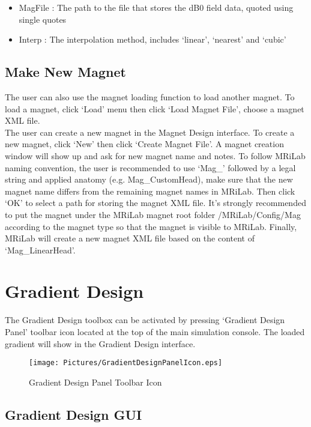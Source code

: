 \documentclass{book}%
\begin{document}
\begin{itemize}
	\item MagFile : The path to the file that stores the dB0 field data, quoted using single quotes
	\item Interp : The interpolation method, includes `linear', `nearest' and `cubic'
\end{itemize}

\subsection{Make New Magnet}

The user can also use the magnet loading function to load another magnet. To load a magnet, click `Load' menu then click `Load Magnet File', choose a magnet XML file.\\

The user can create a new magnet in the Magnet Design interface. To create a new magnet, click `New' then click `Create Magnet File'. A magnet creation window will show up and ask for new magnet name and notes. To follow MRiLab naming convention, the user is recommended to use `Mag\_' followed by a legal string and applied anatomy (e.g. Mag\_CustomHead), make sure that the new magnet name differs from the remaining magnet names in MRiLab. Then click `OK' to select a path for storing the magnet XML file. It's strongly recommended to put the magnet under the MRiLab magnet root folder /MRiLab/Config/Mag according to the magnet type so that the magnet is visible to MRiLab. Finally, MRiLab will create a new magnet XML file based on the content of `Mag\_LinearHead'.

\section{Gradient Design}

The Gradient Design toolbox can be activated by pressing `Gradient Design Panel' toolbar icon located at the top of the main simulation console. The loaded gradient will show in the Gradient Design interface.

\begin{figure}[htbp]
	\centering
		\texttt{[image: Pictures/GradientDesignPanelIcon.eps]}
	\caption{Gradient Design Panel Toolbar Icon}
	\label{fig:GradientDesignPanelIcon}
\end{figure}

\subsection{Gradient Design GUI}
\end{document}
